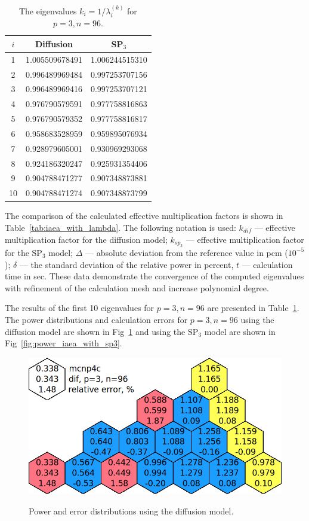 \documentclass[a4paper]{jpconf}
\begin{document}
\begin{table}[htp]
\caption{The eigenvalues $k_i=1/\lambda_i^{(k)}$ for $p=3, n=96$.}
\label{tab:iaea_with_lambda_10}
\begin{center}
\begin{tabular}{c c c}
\hline
$i$ & Diffusion & SP$_3$  \\
\hline
1 & 1.005509678491 & 1.006244515310\\
2 & 0.996489969484 & 0.997253707156\\
3 & 0.996489969416 & 0.997253707121\\
4 & 0.976790579591 & 0.977758816863\\
5 & 0.976790579352 & 0.977758816817\\
6 & 0.958683528959 & 0.959895076934\\
7 & 0.928979605001 & 0.930969293068\\
8 & 0.924186320247 & 0.925931354406\\
9 & 0.904788471277 & 0.907348873881\\
10 & 0.904788471274 & 0.907348873799\\
\hline
\end{tabular}
\end{center}
\end{table}


The comparison of the calculated effective multiplication factors is shown in Table~\ref{tab:iaea_with_lambda}.
The following notation is used: $k_{dif}$ --- effective multiplication factor for the diffusion model; $k_{sp_3}$ --- effective multiplication factor for the $\mathrm{SP_3}$ model; $\Delta$ --- absolute deviation from the reference value in pcm ($10^{-5}$); $\delta$ --- the standard deviation of the relative power in percent, $t$ --- calculation time in sec.
These data demonstrate the convergence of the computed eigenvalues with refinement of the calculation mesh and increase polynomial degree. 

The results of the first 10 eigenvalues for $ p = 3, n = 96 $ are presented in Table~\ref{tab:iaea_with_lambda_10}.
The power distributions and calculation errors for $p = 3, n = 96$ using the diffusion model are shown in Fig~\ref{fig:power_iaea_with_dif} and using the $\mathrm{SP_3}$ model are shown in Fig~\ref{fig:power_iaea_with_sp3}. 

\begin{figure}[htp]
\begin{center}
	\includegraphics[width=0.75\linewidth]{dif.png}\\
	\caption{Power and error distributions using the diffusion model.}
	\label{fig:power_iaea_with_dif}
\end{center}
\end{figure}
\end{document}
